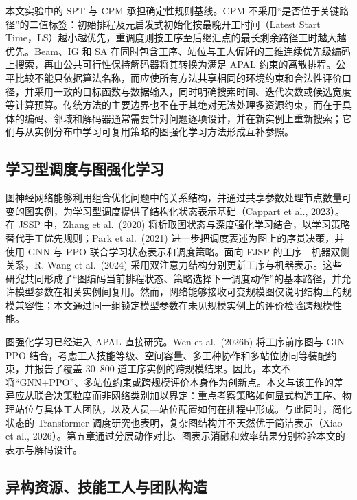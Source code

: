 \documentclass[journal,10pt]{IEEEtran}
\begin{document}
本文实验中的 SPT 与 CPM 承担确定性规则基线。CPM 不采用``是否位于关键路径''的二值标签：初始排程及元启发式初始化按最晚开工时间（Latest Start Time，LS）越小越优先，重调度则按工序至后继汇点的最长剩余路径工时越大越优先。Beam、IG 和 SA 在同时包含工序、站位与工人偏好的三维连续优先级编码上搜索，再由公共可行性保持解码器将其转换为满足 APAL 约束的离散排程。公平比较不能只依据算法名称，而应使所有方法共享相同的环境约束和合法性评价口径，并采用一致的目标函数与数据输入，同时明确搜索时间、迭代次数或候选宽度等计算预算。传统方法的主要边界也不在于其绝对无法处理多资源约束，而在于具体的编码、邻域和解码器通常需要针对问题逐项设计，并在新实例上重新搜索；它们与从实例分布中学习可复用策略的图强化学习方法形成互补参照。

\subsection{学习型调度与图强化学习}\label{ux5b66ux4e60ux578bux8c03ux5ea6ux4e0eux56feux5f3aux5316ux5b66ux4e60}

图神经网络能够利用组合优化问题中的关系结构，并通过共享参数处理节点数量可变的图实例，为学习型调度提供了结构化状态表示基础（Cappart et al., 2023）。在 JSSP 中，Zhang et al.~(2020) 将析取图状态与深度强化学习结合，以学习策略替代手工优先规则；Park et al.~(2021) 进一步把调度表述为图上的序贯决策，并使用 GNN 与 PPO 联合学习状态表示和调度策略。面向 FJSP 的工序---机器双侧关系，R. Wang et al.~(2024) 采用双注意力结构分别更新工序与机器表示。这些研究共同形成了``图编码当前排程状态、策略选择下一调度动作''的基本路径，并允许模型参数在相关实例间复用。然而，网络能够接收可变规模图仅说明结构上的规模兼容性；本文通过同一组锁定模型参数在未见规模实例上的评价检验跨规模性能。

图强化学习已经进入 APAL 直接研究。Wen et al.~(2026b) 将工序前序图与 GIN-PPO 结合，考虑工人技能等级、空间容量、多工种协作和多站位协同等装配约束，并报告了覆盖 30--800 道工序实例的跨规模结果。因此，本文不将``GNN+PPO''、多站位约束或跨规模评价本身作为创新点。本文与该工作的差异应从联合决策粒度而非网络类别加以界定：重点考察策略如何显式构造工序、物理站位与具体工人团队，以及人员---站位配置如何在排程中形成。与此同时，简化状态的 Transformer 调度研究也表明，复杂图结构并不天然优于简洁表示（Xiao et al., 2026）。第五章通过分层动作对比、图表示消融和效率结果分别检验本文的表示与解码设计。

\subsection{异构资源、技能工人与团队构造}\label{ux5f02ux6784ux8d44ux6e90ux6280ux80fdux5de5ux4ebaux4e0eux56e2ux961fux6784ux9020}
\end{document}

